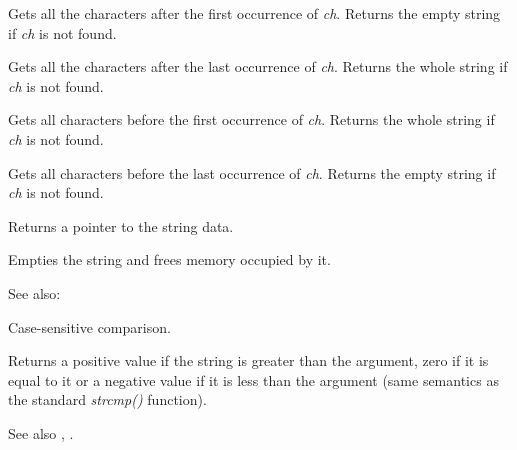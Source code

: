 \label{wxstringafterfirst}


Gets all the characters after the first occurrence of {\it ch}.
Returns the empty string if {\it ch} is not found.

\label{wxstringafterlast}


Gets all the characters after the last occurrence of {\it ch}.
Returns the whole string if {\it ch} is not found.

\label{wxstringbeforefirst}


Gets all characters before the first occurrence of {\it ch}.
Returns the whole string if {\it ch} is not found.

\label{wxstringbeforelast}


Gets all characters before the last occurrence of {\it ch}.
Returns the empty string if {\it ch} is not found.

\label{wxstringcstr}


Returns a pointer to the string data.

\label{wxstringclear}


Empties the string and frees memory occupied by it.

See also: 

\label{wxstringcmp}


Case-sensitive comparison.

Returns a positive value if the string is greater than the argument, zero if
it is equal to it or a negative value if it is less than the argument (same semantics
as the standard {\it strcmp()} function).

See also , .


